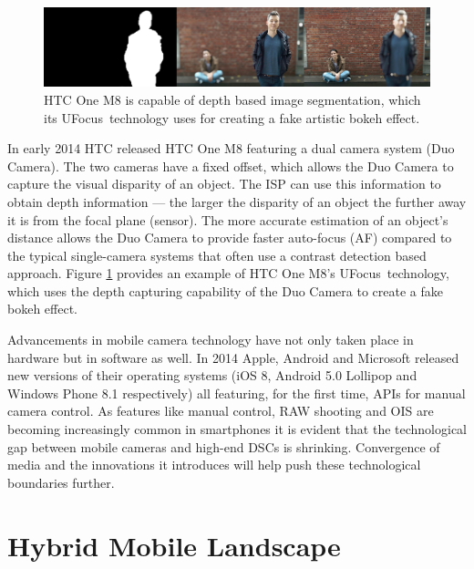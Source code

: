\documentclass[thesis.tex]{subfiles}
\begin{document}
\begin{figure}[ht]
\centering \includegraphics[width=\textwidth]{images/htc-ufocus.jpg}
\caption{HTC One M8 is capable of depth based image segmentation, which its UFocus\texttrademark\ technology uses for creating a fake artistic bokeh effect.\label{figure:htc-ufocus}}
\end{figure}

In early 2014 HTC released HTC One M8 featuring a dual camera system (Duo Camera). The two cameras have a fixed offset, which allows the Duo Camera to capture the visual disparity of an object. The ISP can use this information to obtain depth information --- the larger the disparity of an object the further away it is from the focal plane (sensor). The more accurate estimation of an object's distance allows the Duo Camera to provide faster auto-focus (AF) compared to the typical single-camera systems that often use a contrast detection based approach. Figure \ref{figure:htc-ufocus} provides an example of HTC One M8's UFocus\texttrademark\ technology, which uses the depth capturing capability of the Duo Camera to create a fake bokeh effect.

Advancements in mobile camera technology have not only taken place in hardware but in software as well. In 2014 Apple, Android and Microsoft released new versions of their operating systems (iOS 8, Android 5.0 Lollipop and Windows Phone 8.1 respectively) all featuring, for the first time, APIs for manual camera control. As features like manual control, RAW shooting and OIS are becoming increasingly common in smartphones it is evident that the technological gap between mobile cameras and high-end DSCs is shrinking. Convergence of media and the innovations it introduces will help push these technological boundaries further.

\section{Hybrid Mobile Landscape}
\end{document}
